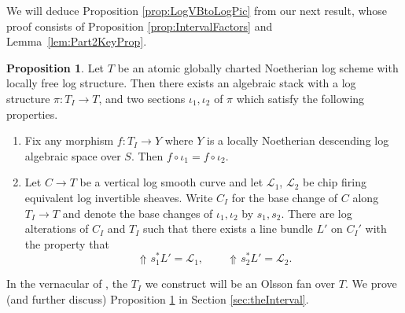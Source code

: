 \documentclass[11pt]{amsart}
\theoremstyle{definition}
\theoremstyle{definition}
\newtheorem{proposition}[theorem]{Proposition}
\DeclareMathOperator{\arrowup}{\!\Uparrow \!}
\begin{document}
We will deduce Proposition \ref{prop:LogVBtoLogPic} from our next result, whose proof consists of Proposition \ref{prop:IntervalFactors} and Lemma~\ref{lem:Part2KeyProp}.

\begin{proposition}\label{prop:TheInterval}
    Let $T$ be an atomic globally charted Noetherian log scheme with locally free log structure. Then there exists an algebraic stack with a log structure $\pi\colon T_I\rightarrow T$, and two sections $\iota_1,\iota_2$ of $\pi$ which satisfy the following properties.
    \begin{enumerate}
        \item\label{prop:The interval property I} Fix any morphism $f\colon T_I\rightarrow Y$ where $Y$ is a locally Noetherian descending log algebraic space over $S$. Then $f\circ \iota_1 = f \circ \iota_2$.
        \item \label{prop: the interval property II} Let $C\rightarrow T$ be a vertical log smooth curve and let $\mathcal{L}_1$, $\mathcal{L}_2$ be chip firing equivalent log invertible sheaves. 
        Write $C_I$ for the base change of $C$ along $T_I\rightarrow T$ and denote the base changes of $\iota_1,\iota_2$ by $s_1,s_2$. There are log alterations of $C_I$ and $T_I$ such that there exists a line bundle $L'$ on $C_I'$ with the property that $$\arrowup s_1^\ast L' = \mathcal{L}_1, \quad \quad \arrowup s_2^\ast L' = \mathcal{L}_2.$$
    \end{enumerate}
\end{proposition}
In the vernacular of \cite{VBOlssonFan}, the $T_I$ we construct will be an Olsson fan over $T$. We prove (and further discuss) Proposition \ref{prop:TheInterval} in Section \ref{sec:theInterval}. 
\end{document}
